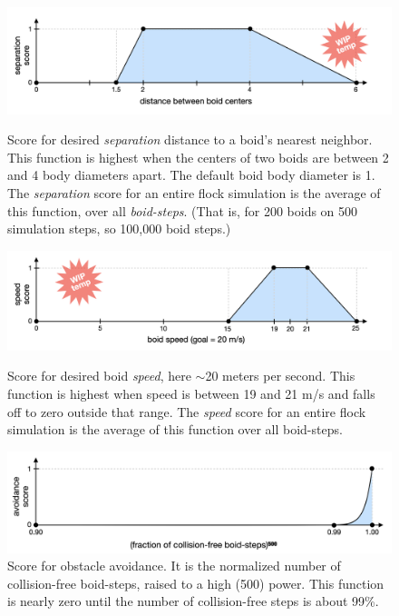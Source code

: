 \documentclass[letterpaper]{article}
\begin{document}
\begin{figure}[]
    \centering
    \includegraphics[width=0.9\linewidth]{images/temp_sep_score.png}
    \caption{Score for desired \textit{separation} distance to a boid's nearest neighbor. This function is highest when the centers of two boids are between 2 and 4 body diameters apart. The default boid body diameter is 1. The \textit{separation} score for an entire flock simulation is the average of this function, over all \textit{boid-steps}. (That is, for 200 boids on 500 simulation steps, so 100,000 boid steps.)\\}
    \label{fig:SeparationScore}

    \centering
    \includegraphics[width=0.9\linewidth]{images/temp_speed_score.png}
    \caption{Score for desired boid \textit{speed}, here $\sim$20 meters per second. This function is highest when speed is between 19 and 21 m/s and falls off to zero outside that range. The \textit{speed} score for an entire flock simulation is the average of this function over all boid-steps.\\}
    \label{fig:speed_score}

    \centering
    \includegraphics[width=0.9\linewidth]{images/temp_avoidance_score.png}
    \caption{Score for obstacle avoidance. It is the normalized number of collision-free boid-steps, raised to a high (500) power. This function is nearly zero until the number of collision-free steps is about 99\%.}
    \label{fig:avoid_score}

\end{figure}
\end{document}
